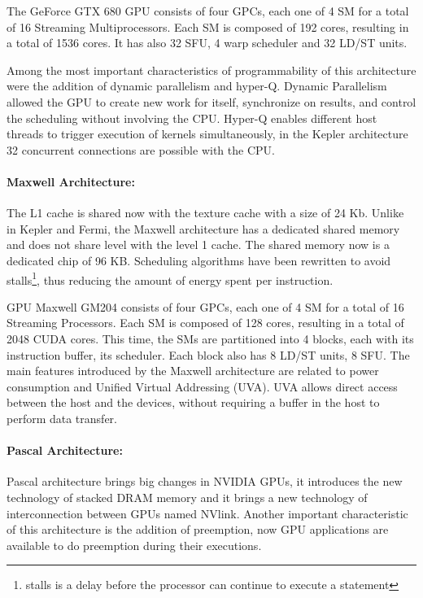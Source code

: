 The GeForce GTX 680 GPU consists of four GPCs, each one of 4 SM for a total of 16 Streaming Multiprocessors. Each SM is composed of 192 cores, resulting in a total of 1536 cores. It has also 32 SFU, 4 warp scheduler and 32 LD/ST units. 

Among the most important characteristics of programmability of this architecture were the addition of dynamic parallelism and hyper-Q. Dynamic Parallelism allowed the GPU to create new work for itself, synchronize on results, and control the scheduling without involving the CPU. Hyper-Q enables different host threads to trigger execution of kernels simultaneously, in the Kepler architecture 32 concurrent connections are possible with the CPU. 


\paragraph{Maxwell Architecture:} 
The L1 cache is shared now with the texture cache with a size of 24 Kb. Unlike in Kepler and Fermi, the Maxwell architecture has a dedicated shared memory and does not share level with the level 1 cache. The shared memory now is a dedicated chip of 96 KB. Scheduling algorithms have been rewritten to avoid stalls\footnote{stalls is a delay before the processor can continue to execute a statement}, thus reducing the amount of energy spent per instruction. 

GPU Maxwell GM204 consists of four GPCs, each one of 4 SM for a total of 16 Streaming Processors. Each SM is composed of 128  cores, resulting in a total of 2048 CUDA cores. This time, the SMs are partitioned into 4 blocks, each with its instruction buffer, its scheduler. Each block also has 8 LD/ST units, 8 SFU. 
The main features introduced by the Maxwell architecture are related to power consumption and Unified Virtual Addressing (UVA). UVA allows direct access between the host and the devices, without requiring a buffer in the host to perform data transfer.

\paragraph{Pascal Architecture:}
Pascal architecture brings big changes in NVIDIA GPUs, it introduces the new technology of stacked DRAM memory and it brings a new technology of interconnection between GPUs named NVlink. Another important characteristic of this architecture is the addition of preemption, now GPU applications are available to do preemption during their executions. 

